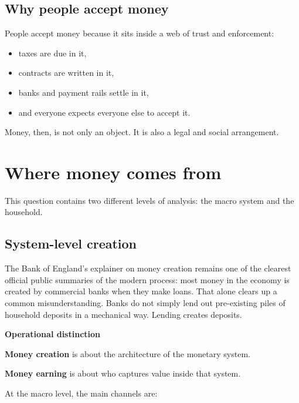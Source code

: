 \documentclass[11pt,openany]{book}
\begin{document}
\section{Why people accept money}

People accept money because it sits inside a web of trust and enforcement:

\begin{itemize}
  \item taxes are due in it,
  \item contracts are written in it,
  \item banks and payment rails settle in it,
  \item and everyone expects everyone else to accept it.
\end{itemize}

Money, then, is not only an object. It is also a legal and social arrangement.

\chapter{Where money comes from}

This question contains two different levels of analysis: the macro system and the household.

\section{System-level creation}

The Bank of England's explainer on money creation remains one of the clearest official public summaries of the modern process: most money in the economy is created by commercial banks when they make loans. That alone clears up a common misunderstanding. Banks do not simply lend out pre-existing piles of household deposits in a mechanical way. Lending creates deposits.

\begin{notebox}
\textbf{Operational distinction}\par
\textbf{Money creation} is about the architecture of the monetary system.\par
\textbf{Money earning} is about who captures value inside that system.
\end{notebox}

At the macro level, the main channels are:
\end{document}
